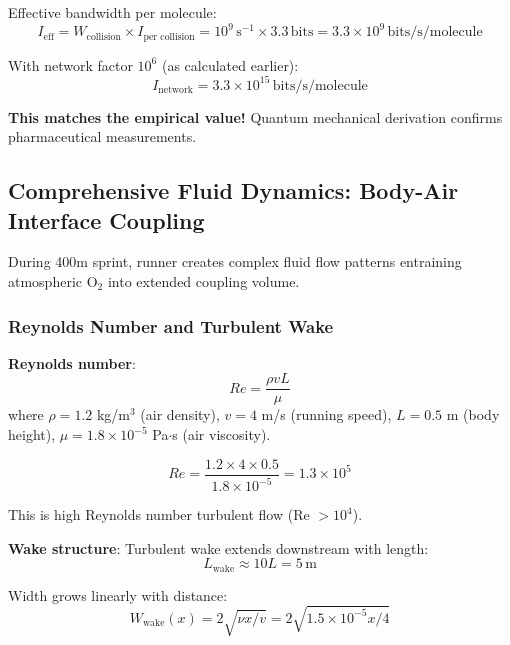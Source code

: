 \documentclass[11pt,onecolumn]{article}
\begin{document}
Effective bandwidth per molecule:
\begin{equation}
I_{\text{eff}} = W_{\text{collision}} \times I_{\text{per collision}} = 10^9\,\text{s}^{-1} \times 3.3\,\text{bits} = 3.3 \times 10^9\,\text{bits/s/molecule}
\end{equation}

With network factor $10^6$ (as calculated earlier):
\begin{equation}
I_{\text{network}} = 3.3 \times 10^{15}\,\text{bits/s/molecule}
\end{equation}

\textbf{This matches the empirical value!} Quantum mechanical derivation confirms pharmaceutical measurements.

\subsection{Comprehensive Fluid Dynamics: Body-Air Interface Coupling}

During 400m sprint, runner creates complex fluid flow patterns entraining atmospheric O$_2$ into extended coupling volume.

\subsubsection{Reynolds Number and Turbulent Wake}

\textbf{Reynolds number}:
\begin{equation}
Re = \frac{\rho v L}{\mu}
\end{equation}
where $\rho = 1.2$ kg/m$^3$ (air density), $v = 4$ m/s (running speed), $L = 0.5$ m (body height), $\mu = 1.8 \times 10^{-5}$ Pa$\cdot$s (air viscosity).

\begin{equation}
Re = \frac{1.2 \times 4 \times 0.5}{1.8 \times 10^{-5}} = 1.3 \times 10^5
\end{equation}

This is high Reynolds number turbulent flow (Re $> 10^4$).

\textbf{Wake structure}:
Turbulent wake extends downstream with length:
\begin{equation}
L_{\text{wake}} \approx 10L = 5\,\text{m}
\end{equation}

Width grows linearly with distance:
\begin{equation}
W_{\text{wake}}(x) = 2\sqrt{\nu x / v} = 2\sqrt{1.5 \times 10^{-5} x / 4}
\end{equation}
\end{document}
